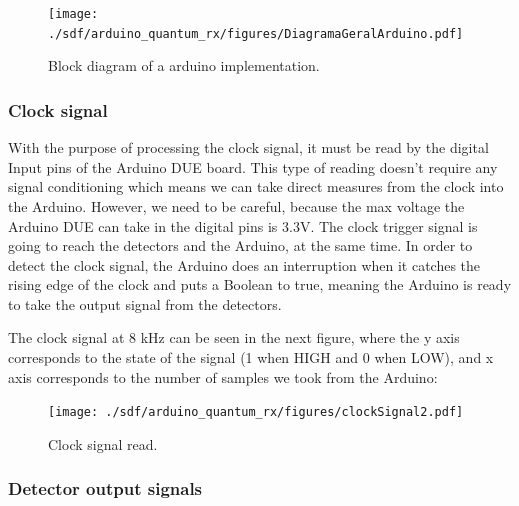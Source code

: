 \begin{refsection}
	\begin{figure}[H]
		\centering
		\texttt{[image: ./sdf/arduino\_quantum\_rx/figures/DiagramaGeralArduino.pdf]}
		\caption{Block diagram of a arduino implementation.}
		\label{fig:netxpto}	
	\end{figure}
	
	\vspace{15px}
	\subsubsection{Clock signal}
	
	With the purpose of processing the clock signal, it must be read by the digital Input pins of the Arduino DUE board. This type of reading doesn't require any signal conditioning which means we can take direct measures from the clock into the Arduino. However, we need to be careful, because the max voltage the Arduino DUE can take in the digital pins is 3.3V. The clock trigger signal is going to reach the detectors and the Arduino, at the same time. In order to detect the clock signal, the Arduino does an interruption when it catches the rising edge of the clock and puts a Boolean to true, meaning the Arduino is ready to take the output signal from the detectors.  

	\clearpage 
	The clock signal at 8 kHz can be seen in the next figure, where the y axis corresponds to the state of the signal (1 when HIGH and 0 when LOW), and x axis corresponds to the number of samples we took from the Arduino:	

   
   
	
	\begin{figure}[H]
		\centering
		\texttt{[image: ./sdf/arduino\_quantum\_rx/figures/clockSignal2.pdf]}
		\caption{Clock signal read.}
		\label{montage}
	\end{figure}

\subsubsection{Detector output signals}


\end{refsection}
